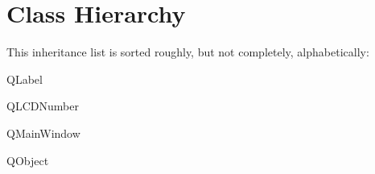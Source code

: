 \section{Class Hierarchy}
This inheritance list is sorted roughly, but not completely, alphabetically\+:\begin{DoxyCompactList}
\item Q\+Label\begin{DoxyCompactList}
\item {}
\end{DoxyCompactList}
\item Q\+L\+C\+D\+Number\begin{DoxyCompactList}
\item {}
\end{DoxyCompactList}
\item Q\+Main\+Window\begin{DoxyCompactList}
\item {}
\end{DoxyCompactList}
\item Q\+Object\begin{DoxyCompactList}
\item {}
\item {}
\item {}
\item {}
\end{DoxyCompactList}
\end{DoxyCompactList}
